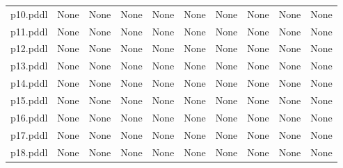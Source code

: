 \documentclass{article}
\begin{document}
\begin{tabular}{@{}lrrrrrrrrr@{}}
p10.pddl & \multicolumn{1}{|l|}{None} & \multicolumn{1}{|l|}{None} & \multicolumn{1}{|l|}{None} & \multicolumn{1}{|l|}{None} & \multicolumn{1}{|l|}{None} & \multicolumn{1}{|l|}{None} & \multicolumn{1}{|l|}{None} & \multicolumn{1}{|l|}{None} & \multicolumn{1}{|l|}{None} \\
p11.pddl & \multicolumn{1}{|l|}{None} & \multicolumn{1}{|l|}{None} & \multicolumn{1}{|l|}{None} & \multicolumn{1}{|l|}{None} & \multicolumn{1}{|l|}{None} & \multicolumn{1}{|l|}{None} & \multicolumn{1}{|l|}{None} & \multicolumn{1}{|l|}{None} & \multicolumn{1}{|l|}{None} \\
p12.pddl & \multicolumn{1}{|l|}{None} & \multicolumn{1}{|l|}{None} & \multicolumn{1}{|l|}{None} & \multicolumn{1}{|l|}{None} & \multicolumn{1}{|l|}{None} & \multicolumn{1}{|l|}{None} & \multicolumn{1}{|l|}{None} & \multicolumn{1}{|l|}{None} & \multicolumn{1}{|l|}{None} \\
p13.pddl & \multicolumn{1}{|l|}{None} & \multicolumn{1}{|l|}{None} & \multicolumn{1}{|l|}{None} & \multicolumn{1}{|l|}{None} & \multicolumn{1}{|l|}{None} & \multicolumn{1}{|l|}{None} & \multicolumn{1}{|l|}{None} & \multicolumn{1}{|l|}{None} & \multicolumn{1}{|l|}{None} \\
p14.pddl & \multicolumn{1}{|l|}{None} & \multicolumn{1}{|l|}{None} & \multicolumn{1}{|l|}{None} & \multicolumn{1}{|l|}{None} & \multicolumn{1}{|l|}{None} & \multicolumn{1}{|l|}{None} & \multicolumn{1}{|l|}{None} & \multicolumn{1}{|l|}{None} & \multicolumn{1}{|l|}{None} \\
p15.pddl & \multicolumn{1}{|l|}{None} & \multicolumn{1}{|l|}{None} & \multicolumn{1}{|l|}{None} & \multicolumn{1}{|l|}{None} & \multicolumn{1}{|l|}{None} & \multicolumn{1}{|l|}{None} & \multicolumn{1}{|l|}{None} & \multicolumn{1}{|l|}{None} & \multicolumn{1}{|l|}{None} \\
p16.pddl & \multicolumn{1}{|l|}{None} & \multicolumn{1}{|l|}{None} & \multicolumn{1}{|l|}{None} & \multicolumn{1}{|l|}{None} & \multicolumn{1}{|l|}{None} & \multicolumn{1}{|l|}{None} & \multicolumn{1}{|l|}{None} & \multicolumn{1}{|l|}{None} & \multicolumn{1}{|l|}{None} \\
p17.pddl & \multicolumn{1}{|l|}{None} & \multicolumn{1}{|l|}{None} & \multicolumn{1}{|l|}{None} & \multicolumn{1}{|l|}{None} & \multicolumn{1}{|l|}{None} & \multicolumn{1}{|l|}{None} & \multicolumn{1}{|l|}{None} & \multicolumn{1}{|l|}{None} & \multicolumn{1}{|l|}{None} \\
p18.pddl & \multicolumn{1}{|l|}{None} & \multicolumn{1}{|l|}{None} & \multicolumn{1}{|l|}{None} & \multicolumn{1}{|l|}{None} & \multicolumn{1}{|l|}{None} & \multicolumn{1}{|l|}{None} & \multicolumn{1}{|l|}{None} & \multicolumn{1}{|l|}{None} & \multicolumn{1}{|l|}{None} \\

\end{tabular}
\end{document}
